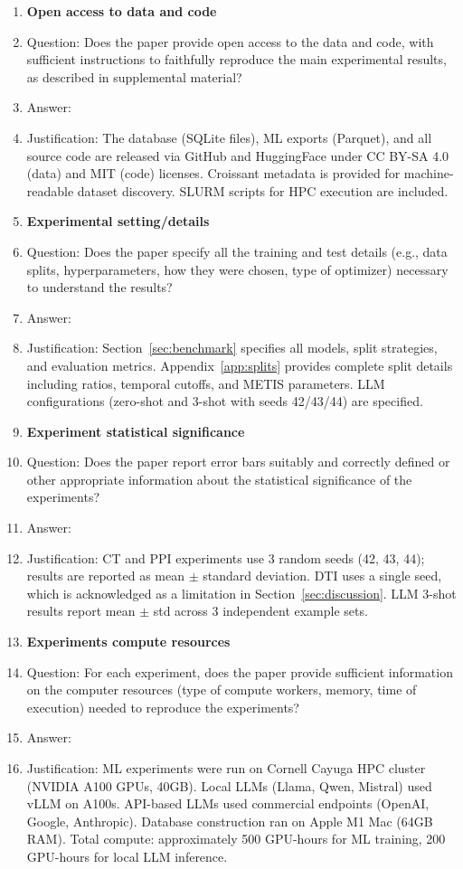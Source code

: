 \begin{enumerate}
\item {\bf Open access to data and code}
    \item[] Question: Does the paper provide open access to the data and code, with sufficient instructions to faithfully reproduce the main experimental results, as described in supplemental material?
    \item[] Answer: \answerYes{}
    \item[] Justification: The database (SQLite files), ML exports (Parquet), and all source code are released via GitHub and HuggingFace under CC BY-SA 4.0 (data) and MIT (code) licenses. Croissant metadata is provided for machine-readable dataset discovery. SLURM scripts for HPC execution are included.

\item {\bf Experimental setting/details}
    \item[] Question: Does the paper specify all the training and test details (e.g., data splits, hyperparameters, how they were chosen, type of optimizer) necessary to understand the results?
    \item[] Answer: \answerYes{}
    \item[] Justification: Section~\ref{sec:benchmark} specifies all models, split strategies, and evaluation metrics. Appendix~\ref{app:splits} provides complete split details including ratios, temporal cutoffs, and METIS parameters. LLM configurations (zero-shot and 3-shot with seeds 42/43/44) are specified.

\item {\bf Experiment statistical significance}
    \item[] Question: Does the paper report error bars suitably and correctly defined or other appropriate information about the statistical significance of the experiments?
    \item[] Answer: \answerYes{}
    \item[] Justification: CT and PPI experiments use 3 random seeds (42, 43, 44); results are reported as mean $\pm$ standard deviation. DTI uses a single seed, which is acknowledged as a limitation in Section~\ref{sec:discussion}. LLM 3-shot results report mean $\pm$ std across 3 independent example sets.

\item {\bf Experiments compute resources}
    \item[] Question: For each experiment, does the paper provide sufficient information on the computer resources (type of compute workers, memory, time of execution) needed to reproduce the experiments?
    \item[] Answer: \answerYes{}
    \item[] Justification: ML experiments were run on Cornell Cayuga HPC cluster (NVIDIA A100 GPUs, 40GB). Local LLMs (Llama, Qwen, Mistral) used vLLM on A100s. API-based LLMs used commercial endpoints (OpenAI, Google, Anthropic). Database construction ran on Apple M1 Mac (64GB RAM). Total compute: approximately 500 GPU-hours for ML training, 200 GPU-hours for local LLM inference.


\end{enumerate}
